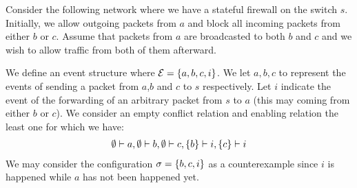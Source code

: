 \begin{example}
    Consider the following network where we have
    a stateful firewall on the switch $s$.
    Initially, we allow outgoing packets from $a$ and
    block all incoming packets from either $b$ or $c$.
    Assume that packets from $a$ are broadcasted to
    both $b$ and $c$ and we wish to allow traffic
    from both of them afterward.
    \begin{center}
    \end{center}
    We define an event structure where
    $\mathcal{E} = \{a,b,c,i\}$.
    We let $a,b,c$ to represent the events of sending
    a packet from $a$,$b$ and $c$ to $s$ respectively.
    Let $i$ indicate the event of the forwarding of
    an arbitrary packet from $s$ to $a$ (this may coming
    from either $b$ or $c$).
    We consider an empty conflict relation and enabling
    relation the least one for which we have:
    \begin{align*}
        \emptyset \vdash a,\emptyset \vdash b, \emptyset \vdash c,
        \{b\} \vdash i, \{c\} \vdash i
    \end{align*}
    We may consider the configuration $\sigma = \{b,c,i\}$ as a
    counterexample since $i$ is happened while $a$ has not been happened yet.
\end{example}